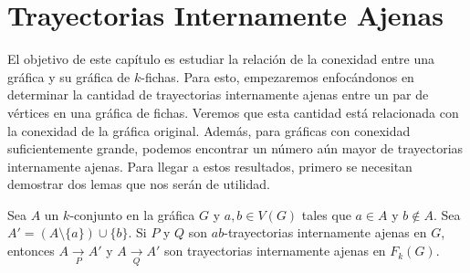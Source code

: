 \newpage

\section{Trayectorias Internamente Ajenas}%
\label{sec:TrayIntAj}

El objetivo de este cap\'itulo es estudiar la relaci\'on de la conexidad entre
una gr\'afica y su gr\'afica de $k$-fichas. Para esto, empezaremos
enfoc\'andonos en determinar la cantidad de trayectorias internamente ajenas
entre un par de v\'ertices en una gr\'afica de fichas. Veremos que esta cantidad
est\'a relacionada con la conexidad de la gr\'afica original. Adem\'as, para
gr\'aficas con conexidad suficientemente grande, podemos encontrar un n\'umero
a\'un mayor de trayectorias internamente ajenas. Para llegar a estos resultados,
primero se necesitan demostrar dos lemas que nos ser\'an de utilidad.

\begin{lema}%
\label{lem:TrayIntAj-G-FG}
Sea $A$ un $k$-conjunto en la gr\'afica $G$ y $a, b \in V(G)$ tales que $a \in
A$ y $b \notin A$. Sea $A' = (A \setminus \{ a \}) \cup \{ b \}$. Si $P$ y $Q$
son $ab$-trayectorias internamente ajenas en $G$, entonces $A \xrightarrow[P]{}
A'$ y $A \xrightarrow[Q]{} A'$ son trayectorias internamente ajenas en
$F_{k}(G)$.
\end{lema}

